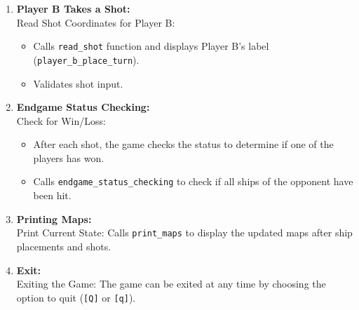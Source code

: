 \begin{enumerate}
    \item \textbf{Player B Takes a Shot:} \\[6pt]
    Read Shot Coordinates for Player B:
    \begin{itemize}
        \item Calls \texttt{read\_shot} function and displays Player B's label (\texttt{player\_b\_place\_turn}).
        \item Validates shot input.
    \end{itemize}

    \item \textbf{Endgame Status Checking:} \\[6pt]
    Check for Win/Loss:
    \begin{itemize}
        \item After each shot, the game checks the status to determine if one of the players has won.
        \item Calls \texttt{endgame\_status\_checking} to check if all ships of the opponent have been hit.
    \end{itemize}

    \item \textbf{Printing Maps:} \\[6pt]
    Print Current State: Calls \texttt{print\_maps} to display the updated maps after ship placements and shots.

    \item \textbf{Exit:} \\[6pt]
    Exiting the Game: The game can be exited at any time by choosing the option to quit (\texttt{[Q]} or \texttt{[q]}).
\end{enumerate}

\newpage

